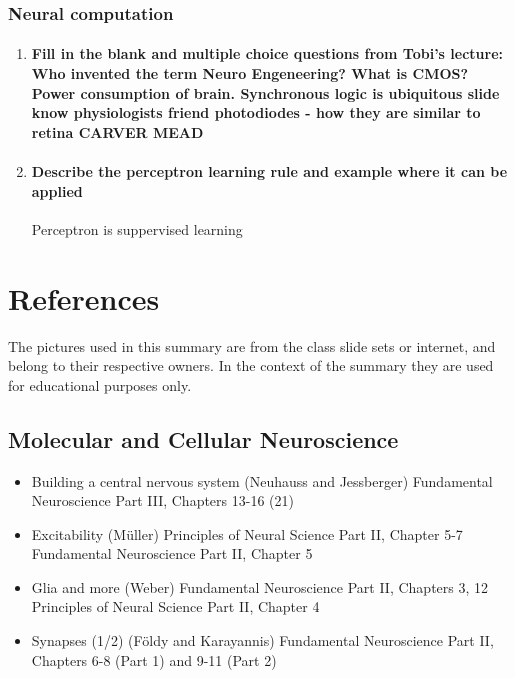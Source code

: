 \documentclass[12pt,article,oneside,a4paper]{memoir}
\begin{document}
\subsubsection{Neural computation}

\begin{enumerate}
\item \paragraph{Fill in the blank and multiple choice questions from Tobi's lecture: Who invented the term Neuro Engeneering? What is CMOS? Power consumption of brain. Synchronous logic is ubiquitous slide know physiologists friend photodiodes - how they are similar to retina CARVER MEAD}

\item \paragraph{Describe the perceptron learning rule and example where it can be applied} 
Perceptron is suppervised learning

\end{enumerate}

\newpage

\section{References}
The pictures used in this summary are from the class slide sets or internet, and belong to their respective owners. In the context of the summary they are used for educational purposes only.

\subsection{Molecular and Cellular Neuroscience}
\begin{itemize}
\item Building a central nervous system (Neuhauss and Jessberger)
\subitem Fundamental Neuroscience Part III, Chapters 13-16 (21)
\item Excitability (Müller)
\subitem Principles of Neural Science Part II, Chapter 5-7
\subitem Fundamental Neuroscience Part II, Chapter 5
\item Glia and more (Weber)
\subitem Fundamental Neuroscience Part II, Chapters 3, 12
\subitem Principles of Neural Science Part II, Chapter 4
\item Synapses (1/2) (Földy and Karayannis)
\subitem Fundamental Neuroscience Part II, Chapters 6-8 (Part 1) and 9-11 (Part 2)
\end{itemize}
\end{document}
